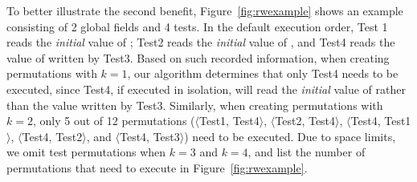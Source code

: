 To better illustrate the second benefit, Figure~\ref{fig:rwexample}
shows an example
consisting of 2 global fields and 4 tests. In the default execution
order, Test 1 reads the \textit{initial} value of ;
Test2 reads the \textit{initial} value of , and Test4
reads the value of  written by Test3.
Based on such recorded information, when creating permutations with $k=1$,
our algorithm determines that only
Test4 needs to be executed, since Test4, if executed in isolation,
will read the \textit{initial} value of  rather than the 
value written by Test3. Similarly, when creating permutations with $k=2$,
only 5 out of 12 permutations ($\langle$Test1, Test4$\rangle$,
$\langle$Test2, Test4$\rangle$, $\langle$Test4, Test1$\rangle$,
$\langle$Test4, Test2$\rangle$, and $\langle$Test4, Test3$\rangle$) need to be executed.
Due to space limits, we omit test permutations when
$k=3$ and $k=4$, and list the number of permutations that need
to execute in Figure~\ref{fig:rwexample}.











